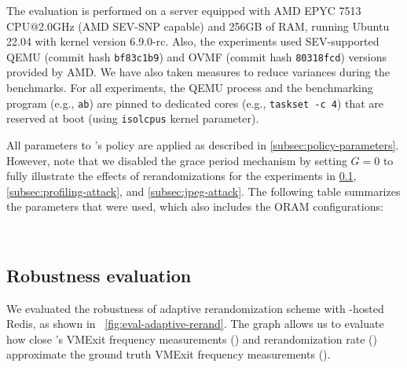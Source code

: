 
The evaluation is performed on a server equipped with AMD EPYC 7513 CPU@2.0GHz (AMD SEV-SNP capable) and 256GB of RAM, running Ubuntu 22.04 with kernel version 6.9.0-rc.
Also, the experiments used SEV-supported QEMU (commit hash \texttt{bf83c1b9}) and OVMF (commit hash \texttt{80318fcd}) versions provided by AMD.
We have also taken measures to reduce variances during the benchmarks.
For all experiments, the QEMU process and the benchmarking program (e.g., \texttt{ab}) are pinned to dedicated cores (e.g., \texttt{taskset -c 4}) that are reserved at boot (using \texttt{isolcpus} kernel parameter).


 {All parameters to \thename's policy are applied as described in \cref{subsec:policy-parameters}}.
However, note that we disabled the grace period mechanism by setting $G=0$ to fully illustrate the effects of rerandomizations for the experiments in \cref{subsec:rate-adaptive-eval}, \cref{subsec:profiling-attack}, and \cref{subsec:jpeg-attack}.
The following table summarizes the parameters that were used, which also includes the ORAM configurations:

\begin{table}[h]
	\setlength\tabcolsep{3pt}
	\renewcommand{\arraystretch}{0.3}
	\footnotesize
	\centering
	
\end{table}
\

\subsection{Robustness evaluation}
\label{subsec:rate-adaptive-eval}
\label{subsec:robustness-eval}
We evaluated the robustness of \thename adaptive rerandomization scheme with \thename-hosted Redis, as shown in ~\autoref{fig:eval-adaptive-rerand}.
The graph allows us to evaluate how close \thename's VMExit frequency measurements () and rerandomization rate ()  approximate the ground truth VMExit frequency measurements ().



